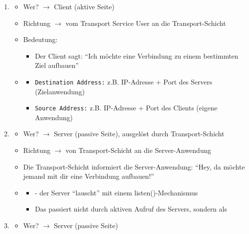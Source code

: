 \begin{enumerate}
    \item {}
    \begin{itemize}
        \item Wer? $\rightarrow$ Client (aktive Seite)
        \item Richtung $\rightarrow$ vom Transport Service User an die Transport-Schicht
        \item Bedeutung:
        \begin{itemize}
            \item Der Client sagt: \enquote{Ich möchte eine Verbindung zu einem bestimmten Ziel aufbauen}
        \end{itemize}
        \item {}
        \begin{itemize}
            \item \texttt{Destination Address:} z.B. IP-Adresse + Port des Servers (Zielanwendung)
            \item \texttt{Source Address:} z.B. IP-Adresse + Port des Clients (eigene Anwendung)
        \end{itemize}
    \end{itemize}
    \item {}
    \begin{itemize}
        \item Wer? $\rightarrow$ Server (passive Seite), ausgelöst durch Transport-Schicht
        \item Richtung $\rightarrow$ von Transport-Schicht an die Server-Anwendung
        \item Die Transport-Schicht informiert die Server-Anwendung: \enquote{Hey, da möchte jemand mit dir eine Verbindung aufbauen!}
        \item {}
        \begin{itemize}
            \item {} - der Server \enquote{lauscht} mit einem listen()-Mechanismus
            \item Das passiert nicht durch aktiven Aufruf des Servers, sondern als 
        \end{itemize}
    \end{itemize}
    \item {}
    \begin{itemize}
        \item Wer? $\rightarrow$ Server (passive Seite)

\end{itemize}
\end{enumerate}
